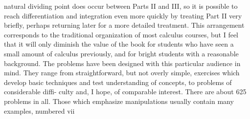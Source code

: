 natural dividing point does occur between Parts II and III, so it is possible to
reach differentiation and integration even more quickly by treating Part II very
briefly, perhaps returning later for a more detailed treatment. This arrangement
corresponds to the traditional organization of most calculus courses, but I feel
that it will only diminish the value of the book for students who have seen a
small amount of calculus previously, and for bright students with a reasonable
background.
The problems have been designed with this particular audience in mind. They
range from straightforward, but not overly simple, exercises which develop basic
techniques and test understanding of concepts, to problems of considerable diffi-
culty and, I hope, of comparable interest. There are about 625 problems in all.
Those which emphasize manipulations usually contain many examples, numbered
vii